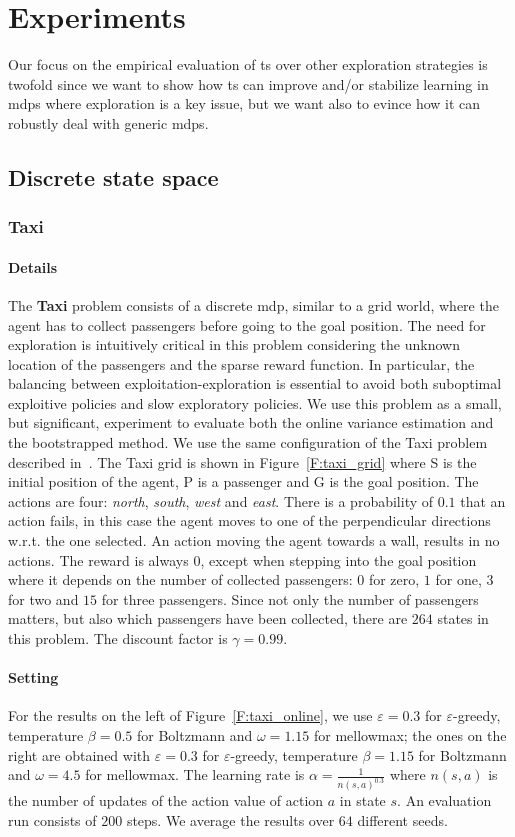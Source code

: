 \section{Experiments}
Our focus on the empirical evaluation of \gls{ts} over other exploration strategies is twofold since we want to show how \gls{ts} can improve and/or stabilize learning in \glspl{mdp} where exploration is a key issue, but we want also to evince how it can robustly deal with generic \glspl{mdp}.
\subsection{Discrete state space}
\subsubsection{Taxi}
\paragraph{Details} The \textbf{Taxi} problem consists of a discrete \gls{mdp}, similar to a grid world, where the agent has to collect passengers before going to the goal position. The need for exploration is intuitively critical in this problem considering the unknown location of the passengers and the sparse reward function. In particular, the balancing between exploitation-exploration is essential to avoid both suboptimal exploitive policies and slow exploratory policies. We use this problem as a small, but significant, experiment to evaluate both the online variance estimation and the bootstrapped method. We use the same configuration of the Taxi problem described in~\cite{pmlr-v70-asadi17a}. The Taxi grid is shown in Figure~\ref{F:taxi_grid} where S is the initial position of the agent, P is a passenger and G is the goal position. The actions are four: \textit{north}, \textit{south}, \textit{west} and \textit{east}. There is a probability of $0.1$ that an action fails, in this case the agent moves to one of the perpendicular directions w.r.t. the one selected. An action moving the agent towards a wall, results in no actions. The reward is always $0$, except when stepping into the goal position where it depends on the number of collected passengers: $0$ for zero, $1$ for one, $3$ for two and $15$ for three passengers. Since not only the number of passengers matters, but also which passengers have been collected, there are $264$ states in this problem. The discount factor is $\gamma = 0.99$.
\paragraph{Setting} For the results on the left of Figure~\ref{F:taxi_online}, we use $\varepsilon = 0.3$ for $\varepsilon$-greedy, temperature $\beta = 0.5$ for Boltzmann and $\omega = 1.15$ for mellowmax; the ones on the right are obtained with $\varepsilon = 0.3$ for $\varepsilon$-greedy, temperature $\beta = 1.15$ for Boltzmann and $\omega = 4.5$ for mellowmax. The learning rate is $\alpha = \frac{1}{n(s,a)^{0.3}}$ where $n(s,a)$ is the number of updates of the action value of action $a$ in state $s$. An evaluation run consists of $200$ steps. We average the results over $64$ different seeds.

